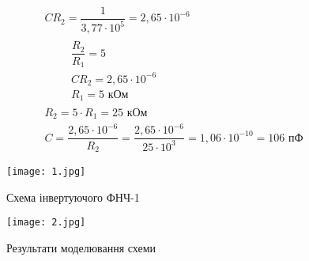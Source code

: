 \documentclass[a4paper,14pt]{extreport}
\begin{document}
\begin{equation}
\begin{array}{c}
C R_{2}=\dfrac{1}{3,77 \cdot 10^{5}}=2,65 \cdot 10^{-6} \\
\qquad \begin{array}{c}
\dfrac{R_{2}}{R_{1}}=5 \\
C R_{2}=2,65 \cdot 10^{-6} \\
R_{1}=5 \text{ кОм}
\end{array} \\
R_{2}=5 \cdot R_{1}=25 \text{ кОм} \\
C=\dfrac{2,65 \cdot 10^{-6}}{R_{2}}=\dfrac{2,65 \cdot 10^{-6}}{25 \cdot 10^{3}}=1,06 \cdot 10^{-10}=106 \text{ пФ}
\end{array}
\end{equation}

\vspace{2 cm}
\begin{center}
\end{center}
\vspace{2 cm}

\begin{figure}[h]
\begin{center}
\texttt{[image: 1.jpg]}
\caption{Схема інвертуючого ФНЧ-1}
\label{ris1}
\end{center}
\end{figure}


\begin{figure}[h]
\begin{center}
\texttt{[image: 2.jpg]}
\caption{Результати моделювання схеми}
\label{ris2}
\end{center}
\end{figure}
\end{document}
